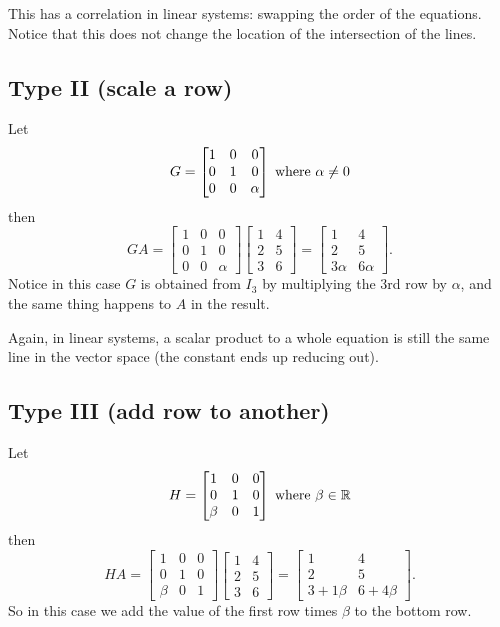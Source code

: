 \begin{aside}
This has a correlation in linear systems: swapping the order of the equations. 
Notice that this does not change the location of the intersection of the lines.
\end{aside}

\subsection{Type II (scale a row)}
Let 
\[G = \left[\begin{matrix}1 & 0 & 0\\ 0 & 1 & 0\\ 0 & 0 & \alpha\end{matrix}\right] \; \textnormal{where }\alpha\ne0\]
then 
\[GA = \left[\begin{matrix}1 & 0 & 0\\ 0 & 1 & 0\\ 0 & 0 & \alpha\end{matrix}\right]\left[\begin{matrix}1 & 4 \\ 2 & 5\\ 3 & 6\end{matrix}\right] = \left[\begin{matrix}1 & 4 \\ 2 & 5\\ 3\alpha & 6\alpha\end{matrix}\right].\]
Notice in this case $G$ is obtained from $I_3$ by multiplying the 3rd row by $\alpha$, 
and the same thing happens to $A$ in the result. 

\begin{aside}
Again, in linear systems, a scalar product to a whole equation is still the same line in the vector space 
(the constant ends up reducing out).
\end{aside}

\subsection{Type III (add row to another)}
Let 
\[H = \left[\begin{matrix}1 & 0 & 0\\ 0 & 1 & 0\\ \beta & 0 & 1\end{matrix}\right] \; \textnormal{where }\beta\in\operatorname{\mathbb{R}}\]
then 
\[HA = \left[\begin{matrix}1 & 0 & 0\\ 0 & 1 & 0\\ \beta & 0 & 1\end{matrix}\right]\left[\begin{matrix}1 & 4 \\ 2 & 5\\ 3 & 6\end{matrix}\right] = \left[\begin{matrix}1 & 4 \\ 2 & 5\\ 3 + 1\beta & 6+4\beta\end{matrix}\right].\]
So in this case we add the value of the first row times $\beta$ to the bottom row. 

